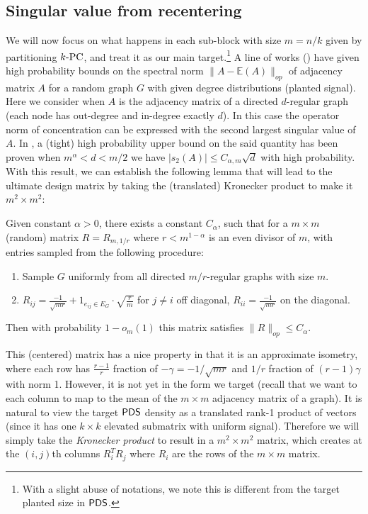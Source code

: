 \documentclass[final,12pt]{colt2023} %
\newcommand\1[1]{\mathbb{I}_{\left\{#1\right\}}}
\begin{document}
\subsection{Singular value from recentering}
We will now focus on what happens in each sub-block with size $m=n/k$ given by partitioning $k\textup{-PC}$, and treat it as our main target.\footnote{With a slight abuse of notations, we note this is different from the target planted size in $\mathsf{PDS}$.}
A line of works (\cite{RegGraphSpectral,LLY17}) have given high probability bounds on the spectral norm $\|A-\mathbb{E}(A)\|_{op}$ of adjacency matrix $A$ for a random graph $G$ with given degree distributions (planted signal). Here we consider when $A$ is the adjacency matrix of a directed $d$-regular graph (each node has out-degree and in-degree exactly $d$). In this case the operator norm of concentration can be expressed with the second largest singular value of $A$. In \cite{RegGraphSpectral}, a (tight) high probability upper bound on the said quantity has been proven when $m^{\alpha}<d<m/2$ we have
$|s_2(A)|\leq C_{\alpha, m}\sqrt{d}$ with high probability. With this result, we can establish the following lemma that will lead to the ultimate design matrix by taking the (translated) Kronecker product to make it $m^2\times m^2$:
\begin{lemma}\label{RegularMatrix}
Given constant $\alpha>0$, there exists a constant $C_\alpha$, such that for a $m\times m$ (random) matrix $R=R_{m, 1/r}$ where $r<m^{1-\alpha}$ is an even divisor of $m$, with entries sampled from the following procedure:
\begin{enumerate}
    \item Sample $G$ uniformly from all directed $m/r$-regular graphs with size $m$.
    \item $R_{ij}=\frac{-1}{\sqrt{mr}}+1_{e_{ij} \in E_G}\cdot\sqrt{\frac{r}{m}}$ for $j\neq i$ off diagonal, $R_{ii}=\frac{-1}{\sqrt{mr}}$ on the diagonal.
\end{enumerate}
Then with probability $1-o_m(1)$ this matrix satisfies
$\|R\|_{op}\leq C_{\alpha}.$
\end{lemma}
This (centered) matrix has a nice property in that it is an approximate isometry, where each row has $\frac{r-1}{r}$ fraction of $-\gamma=-{1}/{\sqrt{mr}}$ and $1/r$ fraction of $(r-1)\gamma$ with norm 1. However, it is not yet in the form we target (recall that we want to each column to map to the mean of the $m\times m$ adjacency matrix of a graph). It is natural to view the target $\mathsf{PDS}$ density as a translated rank-1 product of vectors (since it has one $k\times k$ elevated submatrix with uniform signal). Therefore we will simply take the \emph{Kronecker product} to result in a $m^2\times m^2$ matrix, which creates at the $(i,j)$th columns $R_i^TR_j$ where $R_i$ are the rows of the $m\times m$ matrix. 
\end{document}
